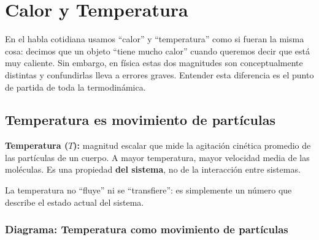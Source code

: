 \renewcommand{\tema}{Termodinámica}

\section{Calor y Temperatura}

\begin{seccion}
En el habla cotidiana usamos ``calor'' y ``temperatura'' como si fueran la misma cosa: decimos que un objeto ``tiene mucho calor'' cuando queremos decir que está muy caliente. Sin embargo, en física estas dos magnitudes son conceptualmente distintas y confundirlas lleva a errores graves. Entender esta diferencia es el punto de partida de toda la termodinámica.
\end{seccion}

\subsection{Temperatura es movimiento de partículas}

\begin{seccion}
\begin{definicion}
\textbf{Temperatura ($T$):} magnitud escalar que mide la agitación cinética promedio de las partículas de un cuerpo. A mayor temperatura, mayor velocidad media de las moléculas. Es una propiedad \textbf{del sistema}, no de la interacción entre sistemas.
\end{definicion}

La temperatura no ``fluye'' ni se ``transfiere'': es simplemente un número que describe el estado actual del sistema.
\end{seccion}

\subsubsection{Diagrama: Temperatura como movimiento de partículas}

